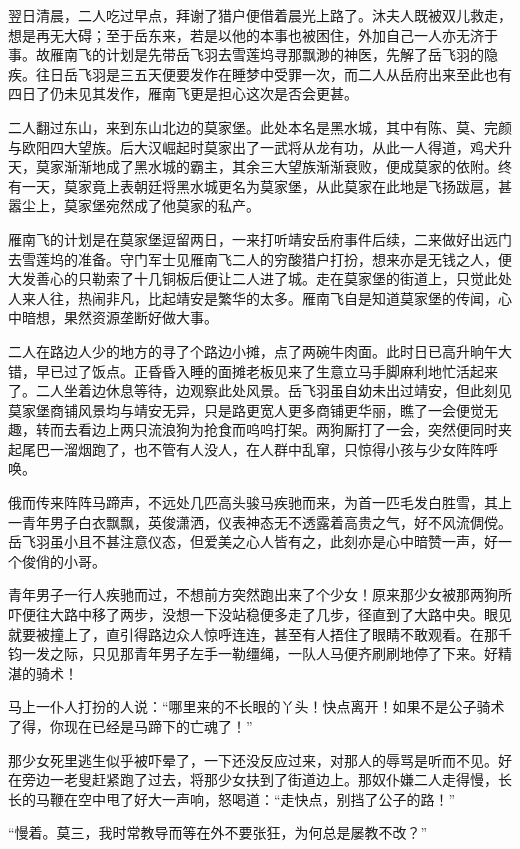 翌日清晨，二人吃过早点，拜谢了猎户便借着晨光上路了。沐夫人既被双儿救走，想是再无大碍；至于岳东来，若是以他的本事也被困住，外加自己一人亦无济于事。故雁南飞的计划是先带岳飞羽去雪莲坞寻那飘渺的神医，先解了岳飞羽的隐疾。往日岳飞羽是三五天便要发作在睡梦中受罪一次，而二人从岳府出来至此也有四日了仍未见其发作，雁南飞更是担心这次是否会更甚。

二人翻过东山，来到东山北边的莫家堡。此处本名是黑水城，其中有陈、莫、完颜与欧阳四大望族。后大汉崛起时莫家出了一武将从龙有功，从此一人得道，鸡犬升天，莫家渐渐地成了黑水城的霸主，其余三大望族渐渐衰败，便成莫家的依附。终有一天，莫家竟上表朝廷将黑水城更名为莫家堡，从此莫家在此地是飞扬跋扈，甚嚣尘上，莫家堡宛然成了他莫家的私产。

雁南飞的计划是在莫家堡逗留两日，一来打听靖安岳府事件后续，二来做好出远门去雪莲坞的准备。守门军士见雁南飞二人的穷酸猎户打扮，想来亦是无钱之人，便大发善心的只勒索了十几铜板后便让二人进了城。走在莫家堡的街道上，只觉此处人来人往，热闹非凡，比起靖安是繁华的太多。雁南飞自是知道莫家堡的传闻，心中暗想，果然资源垄断好做大事。

二人在路边人少的地方的寻了个路边小摊，点了两碗牛肉面。此时日已高升晌午大错，早已过了饭点。正昏昏入睡的面摊老板见来了生意立马手脚麻利地忙活起来了。二人坐着边休息等待，边观察此处风景。岳飞羽虽自幼未出过靖安，但此刻见莫家堡商铺风景均与靖安无异，只是路更宽人更多商铺更华丽，瞧了一会便觉无趣，转而去看边上两只流浪狗为抢食而呜呜打架。两狗厮打了一会，突然便同时夹起尾巴一溜烟跑了，也不管有人没人，在人群中乱窜，只惊得小孩与少女阵阵呼唤。

俄而传来阵阵马蹄声，不远处几匹高头骏马疾驰而来，为首一匹毛发白胜雪，其上一青年男子白衣飘飘，英俊潇洒，仪表神态无不透露着高贵之气，好不风流倜傥。岳飞羽虽小且不甚注意仪态，但爱美之心人皆有之，此刻亦是心中暗赞一声，好一个俊俏的小哥。

青年男子一行人疾驰而过，不想前方突然跑出来了个少女！原来那少女被那两狗所吓便往大路中移了两步，没想一下没站稳便多走了几步，径直到了大路中央。眼见就要被撞上了，直引得路边众人惊呼连连，甚至有人捂住了眼睛不敢观看。在那千钧一发之际，只见那青年男子左手一勒缰绳，一队人马便齐刷刷地停了下来。好精湛的骑术！

马上一仆人打扮的人说：“哪里来的不长眼的丫头！快点离开！如果不是公子骑术了得，你现在已经是马蹄下的亡魂了！”

那少女死里逃生似乎被吓晕了，一下还没反应过来，对那人的辱骂是听而不见。好在旁边一老叟赶紧跑了过去，将那少女扶到了街道边上。那奴仆嫌二人走得慢，长长的马鞭在空中甩了好大一声响，怒喝道：“走快点，别挡了公子的路！”

“慢着。莫三，我时常教导而等在外不要张狂，为何总是屡教不改？”


